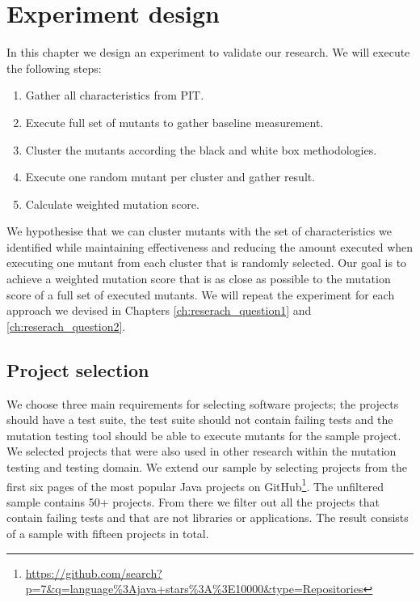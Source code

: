 \documentclass[../main]{subfiles}
\begin{document}
\chapter{Experiment design}
In this chapter we design an experiment to validate our research.
We will execute the following steps:
\begin{enumerate}
    \item Gather all characteristics from PIT.
    \item Execute full set of mutants to gather baseline measurement.
    \item Cluster the mutants according the black and white box methodologies.
    \item Execute one random mutant per cluster and gather result.
    \item Calculate weighted mutation score.
\end{enumerate}
We hypothesise that we can cluster mutants with the set of characteristics we identified
while maintaining effectiveness and reducing the amount executed when executing one mutant from each cluster that is randomly selected.
Our goal is to achieve a weighted mutation score that is as close as possible to the mutation score of a full set of executed mutants.
We will repeat the experiment for each approach we devised in Chapters \ref{ch:reserach_question1} and \ref{ch:reserach_question2}.

\section{Project selection}
\label{ch:project_selection}
We choose three main requirements for selecting software projects; the projects should have a test suite, the test suite should not contain failing tests and the mutation testing tool should be able to execute mutants for the sample project.
We selected projects that were also used in other research within the mutation testing and testing domain\cite{Pizzoleto2019,Yu2019PossibilityScope,Wei2021SpectralTesting, Zhang2019PredictiveTesting, Chen2018SpeedingStudy, Laurent2017AssessingPIT}.
\newline
We extend our sample by selecting projects from the first six pages of the most popular Java projects on GitHub\footnote{\url{https://github.com/search?p=7&q=language\%3Ajava+stars\%3A\%3E10000&type=Repositories}}.
The unfiltered sample contains 50+ projects.
From there we filter out all the projects that contain failing tests and that are not libraries or applications.
The result consists of a sample with fifteen projects in total.
\end{document}
